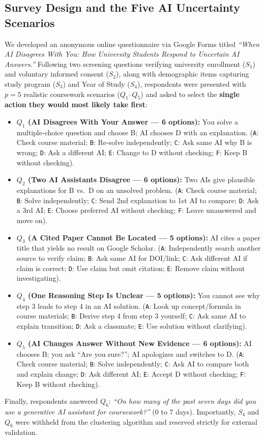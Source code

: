 \documentclass[11pt,a4paper]{article}
\begin{document}
\subsection{Survey Design and the Five AI Uncertainty Scenarios}
We developed an anonymous online questionnaire via Google Forms titled \textit{``When AI Disagrees With You: How University Students Respond to Uncertain AI Answers.''} Following two screening questions verifying university enrollment ($S_1$) and voluntary informed consent ($S_2$), along with demographic items capturing study program ($S_3$) and Year of Study ($S_4$), respondents were presented with $p = 5$ realistic coursework scenarios ($Q_1$--$Q_5$) and asked to select the \textbf{single action they would most likely take first}:
\begin{itemize}
    \item \textbf{$Q_1$ (AI Disagrees With Your Answer --- 6 options):} You solve a multiple-choice question and choose B; AI chooses D with an explanation. (\texttt{A}: Check course material; \texttt{B}: Re-solve independently; \texttt{C}: Ask same AI why B is wrong; \texttt{D}: Ask a different AI; \texttt{E}: Change to D without checking; \texttt{F}: Keep B without checking).
    \item \textbf{$Q_2$ (Two AI Assistants Disagree --- 6 options):} Two AIs give plausible explanations for B vs.\ D on an unsolved problem. (\texttt{A}: Check course material; \texttt{B}: Solve independently; \texttt{C}: Send 2nd explanation to 1st AI to compare; \texttt{D}: Ask a 3rd AI; \texttt{E}: Choose preferred AI without checking; \texttt{F}: Leave unanswered and move on).
    \item \textbf{$Q_3$ (A Cited Paper Cannot Be Located --- 5 options):} AI cites a paper title that yields no result on Google Scholar. (\texttt{A}: Independently search another source to verify claim; \texttt{B}: Ask same AI for DOI/link; \texttt{C}: Ask different AI if claim is correct; \texttt{D}: Use claim but omit citation; \texttt{E}: Remove claim without investigating).
    \item \textbf{$Q_4$ (One Reasoning Step Is Unclear --- 5 options):} You cannot see why step 3 leads to step 4 in an AI solution. (\texttt{A}: Look up concept/formula in course materials; \texttt{B}: Derive step 4 from step 3 yourself; \texttt{C}: Ask same AI to explain transition; \texttt{D}: Ask a classmate; \texttt{E}: Use solution without clarifying).
    \item \textbf{$Q_5$ (AI Changes Answer Without New Evidence --- 6 options):} AI chooses B; you ask ``Are you sure?''; AI apologizes and switches to D. (\texttt{A}: Check course material; \texttt{B}: Solve independently; \texttt{C}: Ask AI to compare both and explain change; \texttt{D}: Ask different AI; \texttt{E}: Accept D without checking; \texttt{F}: Keep B without checking).
\end{itemize}
Finally, respondents answered $Q_6$: \textit{``On how many of the past seven days did you use a generative AI assistant for coursework?''} ($0$ to $7$ days). Importantly, $S_4$ and $Q_6$ were withheld from the clustering algorithm and reserved strictly for external validation.
\end{document}
